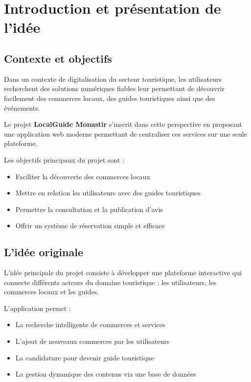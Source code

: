 \documentclass[12pt,a4paper]{report}
\begin{document}
\tableofcontents
\newpage

\chapter{Introduction et présentation de l’idée}

\section{Contexte et objectifs}

Dans un contexte de digitalisation du secteur touristique, les utilisateurs recherchent des solutions numériques fiables leur permettant de découvrir facilement des commerces locaux, des guides touristiques ainsi que des événements.

Le projet \textbf{LocalGuide Monastir} s’inscrit dans cette perspective en proposant une application web moderne permettant de centraliser ces services sur une seule plateforme.

Les objectifs principaux du projet sont :
\begin{itemize}
    \item Faciliter la découverte des commerces locaux
    \item Mettre en relation les utilisateurs avec des guides touristiques
    \item Permettre la consultation et la publication d’avis
    \item Offrir un système de réservation simple et efficace
\end{itemize}


\section{L’idée originale}

L’idée principale du projet consiste à développer une plateforme interactive qui connecte différents acteurs du domaine touristique : les utilisateurs, les commerces locaux et les guides.

L’application permet :
\begin{itemize}
    \item La recherche intelligente de commerces et services
    \item L’ajout de nouveaux commerces par les utilisateurs
    \item La candidature pour devenir guide touristique
    \item La gestion dynamique des contenus via une base de données
\end{itemize}
\end{document}
